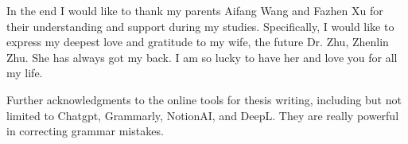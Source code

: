 In the end I would like to thank my parents Aifang Wang and Fazhen Xu for their understanding and support during my studies. 
Specifically, I would like to express my deepest love and gratitude to my wife, the future Dr. Zhu, Zhenlin Zhu. She has always got my back. I am so lucky to have her and love you for all my life.


Further acknowledgments to the online tools for thesis writing, including but not limited to Chatgpt, Grammarly, NotionAI, and DeepL. They are really powerful in correcting grammar mistakes.
 








